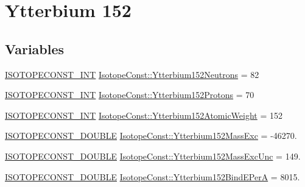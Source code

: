 \hypertarget{group___isotope_const-_ytterbium-_yb152}{}\section{Ytterbium 152}
\label{group___isotope_const-_ytterbium-_yb152}
\subsection*{Variables}
\begin{DoxyCompactItemize}
\item 
\mbox{\hyperlink{group___isotope_const-_macros_ga5f18360b3e99483a35c32d789e62621c}{I\+S\+O\+T\+O\+P\+E\+C\+O\+N\+S\+T\+\_\+\+I\+NT}} \mbox{\hyperlink{group___isotope_const-_ytterbium-_yb152_gabd8fec44f3800b2ad92ed0d06b61a1d4}{Isotope\+Const\+::\+Ytterbium152\+Neutrons}} = 82
\item 
\mbox{\hyperlink{group___isotope_const-_macros_ga5f18360b3e99483a35c32d789e62621c}{I\+S\+O\+T\+O\+P\+E\+C\+O\+N\+S\+T\+\_\+\+I\+NT}} \mbox{\hyperlink{group___isotope_const-_ytterbium-_yb152_gad2dbb14a9f7c9b85255235dbb1609dcd}{Isotope\+Const\+::\+Ytterbium152\+Protons}} = 70
\item 
\mbox{\hyperlink{group___isotope_const-_macros_ga5f18360b3e99483a35c32d789e62621c}{I\+S\+O\+T\+O\+P\+E\+C\+O\+N\+S\+T\+\_\+\+I\+NT}} \mbox{\hyperlink{group___isotope_const-_ytterbium-_yb152_gaf8dc85b3a3cf625b206d601cdd4a695c}{Isotope\+Const\+::\+Ytterbium152\+Atomic\+Weight}} = 152
\item 
\mbox{\hyperlink{group___isotope_const-_macros_ga8f45a7272ce02c0b4c65c44636ed719a}{I\+S\+O\+T\+O\+P\+E\+C\+O\+N\+S\+T\+\_\+\+D\+O\+U\+B\+LE}} \mbox{\hyperlink{group___isotope_const-_ytterbium-_yb152_gaa41b52d96f36cbcc73929e8823930254}{Isotope\+Const\+::\+Ytterbium152\+Mass\+Exc}} = -\/46270.
\item 
\mbox{\hyperlink{group___isotope_const-_macros_ga8f45a7272ce02c0b4c65c44636ed719a}{I\+S\+O\+T\+O\+P\+E\+C\+O\+N\+S\+T\+\_\+\+D\+O\+U\+B\+LE}} \mbox{\hyperlink{group___isotope_const-_ytterbium-_yb152_ga9b42a56785b55199fb859109158c6a6f}{Isotope\+Const\+::\+Ytterbium152\+Mass\+Exc\+Unc}} = 149.
\item 
\mbox{\hyperlink{group___isotope_const-_macros_ga8f45a7272ce02c0b4c65c44636ed719a}{I\+S\+O\+T\+O\+P\+E\+C\+O\+N\+S\+T\+\_\+\+D\+O\+U\+B\+LE}} \mbox{\hyperlink{group___isotope_const-_ytterbium-_yb152_gaa338021565e100b2696062ef1a542768}{Isotope\+Const\+::\+Ytterbium152\+Bind\+E\+PerA}} = 8015.
\item 

\end{DoxyCompactItemize}
